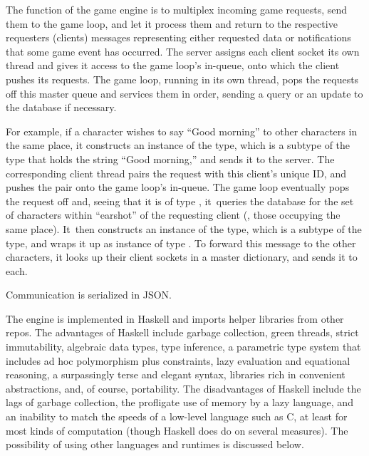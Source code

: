 The function of the game engine is to multiplex incoming game requests,
send them to the game loop, and let it process them and return to the
respective requesters (clients) messages representing either requested data
or notifications that some game event has occurred.
The server assigns each client socket its own thread and gives it access to the
game loop's in-queue, onto which the client pushes its requests.
The game loop, running in its own thread, pops the requests
off this master queue and services them in order, sending a query or an update
to the database if necessary.

For example, if a character wishes to say ``Good morning'' to other characters
in the same place, it constructs an instance of the  type, which is a
subtype of the  type that holds the string ``Good morning,'' and
sends it to the server.
The corresponding client thread pairs the request with this client's unique
ID, and pushes the pair onto the game loop's in-queue.
The game loop eventually pops the request off and, seeing that it is
of type , it~queries the database
for the set of characters within ``earshot'' of the requesting client (\ie,
those occupying the same place).
It~then constructs an instance of the
 type, which is a subtype of the  type, and wraps it up
as instance of type .
To forward this message to the other characters, it looks up
their client sockets in a master dictionary, and sends it to each.

Communication is serialized in JSON\@.

The engine is implemented in Haskell and imports helper libraries from other
repos.
The advantages of Haskell include
garbage collection, green threads, strict immutability, algebraic data types,
type inference, a parametric type system that includes ad hoc polymorphism plus
constraints, lazy evaluation and equational reasoning, a surpassingly terse
and elegant syntax, libraries rich in convenient abstractions, and, of course,
portability.
The disadvantages of Haskell include the lags of
garbage collection, the profligate use of memory by a lazy
language, and an inability to match the speeds of a low-level language such as
C, at least for most kinds of computation (though Haskell does do
 on several measures).
The possibility of using other languages and runtimes is discussed below.


